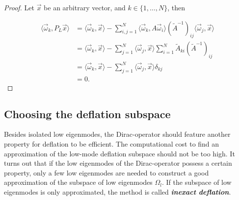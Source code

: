\documentclass{article}
\theoremstyle{plain} %
\theoremstyle{convention} %
\theoremstyle{remark} %
\def\df#1{\textbf{\textit{#1}}}
\numberwithin{equation}{section}
\begin{document}
\begin{proof}

Let $\vec{x}$ be an arbitrary vector, and $k \in \{1, \dots, N\}$, then

\begin{align*}
    \langle \vec{\omega}_k, P_L \vec{x} \rangle &= \langle \vec{\omega}_k, \vec{x} \rangle - \sum_{i,j=1}^N \langle \vec{\omega}_k, A \vec{\omega}_i \rangle (\widetilde{A}^{-1})_{ij} \langle \vec{\omega}_j, \vec{x} \rangle \\
    &= \langle \vec{\omega}_k, \vec{x} \rangle - \sum_{j=1}^N \langle \vec{\omega}_j, \vec{x} \rangle \sum_{i=1}^N \widetilde{A}_{ki} (\widetilde{A}^{-1})_{ij} \\
    &= \langle \vec{\omega}_k, \vec{x} \rangle - \sum_{j=1}^N \langle \vec{\omega}_j, \vec{x} \rangle \delta_{kj} \\
    &= 0.
\end{align*}

\end{proof}

\subsection{Choosing the deflation subspace}

\label{sec:dfl_subspace}

Besides isolated low eigenmodes, the Dirac-operator should feature another property for deflation to be efficient. The computational cost to find an approximation of the low-mode deflation subspace should not be too high. It turns out that if the low eigenmodes of the Dirac-operator possess a certain property, only a few low eigenmodes are needed to construct a good approximation of the subspace of low eigenmodes $\Omega_l$. If the subspace of low eigenmodes is only approximated, the method is called \df{inexact deflation}.
\end{document}
